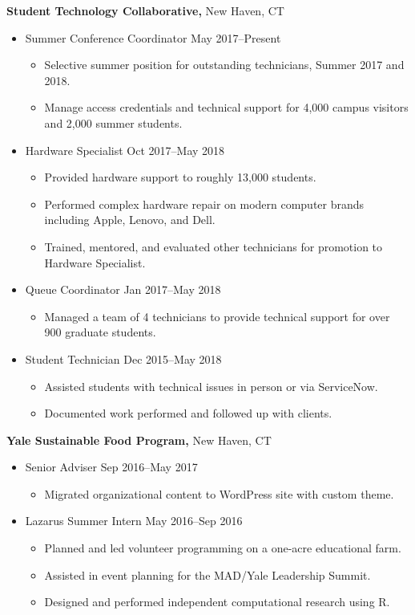 \documentclass[11pt]{article}
\newcommand{\position}[2]{#1 \hfill #2}
\newcommand{\emphasized}[2]{\emphasis{#1} \medemph{#2}}
\newcommand{\emphasis}[1]{\textbf{\textsf{#1}}}
\newcommand{\medemph}[1]{\textsf{#1}}
\newenvironment{experience}{
	\begin{itemize}[leftmargin=*, topsep=0pt] %
		\setlength{\itemsep}{0pt} %
		\setlength{\parskip}{0pt} %
		\setlength{\parsep}{10pt} %
	}{
	\end{itemize}
}
\begin{document}
\emphasized{Student Technology Collaborative,}{New Haven, CT}
\begin{experience}
	\item \position{Summer Conference Coordinator}{May 2017--Present}
	\begin{experience}
		\item Selective summer position for outstanding technicians, Summer 2017 and 2018.
		\item Manage access credentials and technical support for 4,000 campus visitors and 2,000 summer students. 
	\end{experience}
	\item \position{Hardware Specialist}{Oct 2017--May 2018}
	\begin{experience}
		\item Provided hardware support to roughly 13,000 students.
		\item Performed complex hardware repair on modern computer brands including Apple, Lenovo, and Dell.
		\item Trained, mentored, and evaluated other technicians for promotion to Hardware Specialist. 
	\end{experience}
	\item \position{Queue Coordinator}{Jan 2017--May 2018}
	\begin{experience}
		\item Managed a team of 4 technicians to provide technical support for over 900 graduate students.
	\end{experience}
	\item \position{Student Technician}{Dec 2015--May 2018}
	\begin{experience}
		\item Assisted students with technical issues in person or via ServiceNow. 
		\item Documented work performed and followed up with clients.\\
	\end{experience}
\end{experience}

\emphasized{Yale Sustainable Food Program,}{New Haven, CT}
\begin{experience}
	\item \position{Senior Adviser}{Sep 2016--May 2017}
	\begin{experience}
		\item Migrated organizational content to WordPress site with custom theme.
	\end{experience}
	\item \position{Lazarus Summer Intern}{May 2016--Sep 2016}
	\begin{experience}
		\item Planned and led volunteer programming on a one-acre educational farm. 
		\item Assisted in event planning for the MAD/Yale Leadership Summit. 
		\item Designed and performed independent computational research using R.\\
	\end{experience}
\end{experience}
\end{document}
